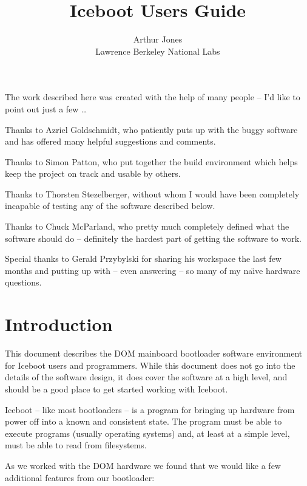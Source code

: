 \documentclass{article}
\begin{document}
\title{Iceboot Users Guide}
\author{Arthur Jones \\ Lawrence Berkeley National Labs }
\maketitle
\thispagestyle{empty}

\eject

The work described here was created with the help
of many people -- I'd like to point out just a few \ldots

Thanks to Azriel Goldschmidt, who patiently puts up with the
buggy software and has offered many helpful suggestions
and comments.

Thanks to Simon Patton, who put together the build environment
which helps keep the project on track and usable
by others.

Thanks to Thorsten Stezelberger, without whom
I would have been completely incapable of testing
any of the software described below.

Thanks to Chuck McParland, who pretty much
completely defined what the software should 
do -- definitely the hardest part of getting the
software to work.

Special thanks to Gerald Przybylski
for sharing his workspace the last few months
and putting up with -- even answering -- so 
many of my na\" \i ve hardware questions.

\thispagestyle{empty}

\eject

\tableofcontents

\eject

\section{Introduction}

This document describes
the DOM mainboard bootloader software environment 
for Iceboot users and programmers.  While
this document does not go into the details of the
software design, it does cover the software at
a high level, and should be a good place to get
started working with Iceboot.

Iceboot -- like most bootloaders -- is a program 
for bringing up hardware from power off into a 
known and consistent state.  The program must be
able to execute programs (usually operating systems)
and, at least at a simple level, must be able to
read from filesystems.

As we worked with the DOM hardware we found
that we would like a few additional features from our
bootloader:
\end{document}
